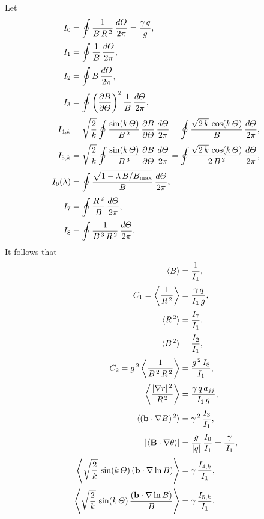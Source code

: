 \documentclass[notitlepage,12pt]{article}
\begin{document}
Let
\begin{align}
I_0 &= \oint \frac{1}{B\,R^{\,2}}\,\frac{d{\mit\Theta}}{2\pi}=\frac{\gamma\,q}{g},\\[0.5ex]
I_1 &=\oint \frac{1}{B}\,\frac{d{\mit\Theta}}{2\pi},\\[0.5ex]
I_2 &=\oint B\,\frac{d{\mit\Theta}}{2\pi},\\[0.5ex]
I_3 &=\oint\left(\frac{\partial B}{\partial{\mit\Theta}}\right)^2\frac{1}{B}\,\frac{d{\mit\Theta}}{2\pi},\\[0.5ex]
I_{4,k}&= \sqrt{\frac{2}{k}}\oint \frac{\sin(k\,{\mit\Theta})}{B^{\,2}}\,\frac{\partial B}{\partial{\mit\Theta}}\,\frac{d{\mit\Theta}}{2\pi}=\oint\frac{\sqrt{2\,k}\,\cos(k\,{\mit\Theta})}{B}\,\frac{d{\mit\Theta}}{2\pi},\\[0.5ex]
I_{5,k} &= \sqrt{\frac{2}{k}}\oint \frac{\sin(k\,{\mit\Theta})}{B^{\,3}}\,\frac{\partial B}{\partial{\mit\Theta}}\,\frac{d{\mit\Theta}}{2\pi}=\oint\frac{\sqrt{2\,k}\,\cos(k\,{\mit\Theta})}{2\,B^{\,2}}\,\frac{d{\mit\Theta}}{2\pi},\\[0.5ex]
I_6(\lambda) &=\oint \frac{\sqrt{1-\lambda\,B/B_{\rm max}}}{B}\,\frac{d{\mit\Theta}}{2\pi},\\[0.5ex]
I_7 &= \oint\frac{R^{\,2}}{B}\,\frac{d{\mit\Theta}}{2\pi},\\[0.5ex]
I_8 &= \oint \frac{1}{B^{\,3}\,R^{\,2}}\,\frac{d{\mit\Theta}}{2\pi}.
\end{align}
It follows that
\begin{align}
\langle B\rangle &= \frac{1}{I_1},\\[0.5ex]
C_1=\left\langle \frac{1}{R^{\,2}}\right\rangle&= \frac{\gamma\,q}{I_1\,g},\\[0.5ex]\langle R^{\,2}\rangle &= \frac{I_7}{I_1},\\[0.5ex]
\langle B^{\,2}\rangle &= \frac{I_2}{I_1},\\[0.5ex]
C_2 = g^{\,2}\left\langle \frac{1}{B^{\,2}\,R^{\,2}}\right\rangle&= \frac {g^{\,2}\,I_8}{I_1},\\[0.5ex]
\left\langle \frac{|\nabla r|^{\,2}}{R^{\,2}}\right\rangle &= \frac{\gamma\,q\,a_{jj}}{I_1\,g},\\[0.5ex]
\langle ({\bf b}\cdot\nabla B)^{\,2}\rangle&= \gamma^{\,2}\,\frac{I_3}{I_1},\\[0.5ex]
|\langle {\bf B}\cdot \nabla \theta\rangle|&= \frac{g}{|q|}\,\frac{I_0}{I_1} = \frac{|\gamma|}{I_1},
\\[0.5ex]
\left\langle \sqrt{\frac{2}{k}}\,\sin(k\,{\mit\Theta}) \,({\bf b}\cdot\nabla \ln B)\right\rangle &= \gamma\,\frac{I_{4,k}}{I_1},\\[0.5ex]
\left\langle \sqrt{\frac{2}{k}}\,\sin(k\,{\mit\Theta}) \,\frac{({\bf b}\cdot\nabla \ln B)}{B}\right\rangle &= \gamma\,\frac{I_{5,k}}{I_1}.
\end{align}
\end{document}
